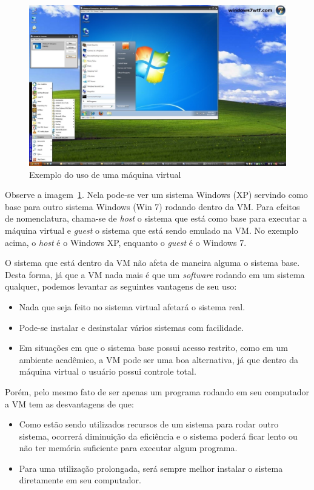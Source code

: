 \documentclass{handout_utfpr}
\begin{document}
\begin{figure}[!h]
  \centering
  \includegraphics[scale=.3]{imagens/vm.jpg}
  \caption{Exemplo do uso de uma máquina virtual}
  \label{fig:vm}
\end{figure}

Observe a imagem~\ref{fig:vm}. Nela pode-se ver um sistema Windows (XP) servindo como base para outro sistema Windows (Win 7) rodando dentro da VM\@. Para efeitos de nomenclatura, chama-se de \textit{host} o sistema que está como base para executar a máquina virtual e \textit{guest} o sistema que está sendo emulado na VM\@. No exemplo acima, o \textit{host} é o Windows XP, enquanto o \textit{guest} é o Windows 7.

O sistema que está dentro da VM não afeta de maneira alguma o sistema base. Desta forma, já que a VM nada mais é que um \textit{software} rodando em um sistema qualquer, podemos levantar as seguintes vantagens de seu uso:

\begin{itemize}
\item Nada que seja feito no sistema virtual afetará o sistema real.
\item Pode-se instalar e desinstalar vários sistemas com facilidade.
\item Em situações em que o sistema base possui acesso restrito, como em um ambiente acadêmico, a VM pode ser uma boa alternativa, já que dentro da máquina virtual o usuário possui controle total.
\end{itemize}

Porém, pelo mesmo fato de ser apenas um programa rodando em seu computador a VM tem as desvantagens de que:

\begin{itemize}
\item Como estão sendo utilizados recursos de um sistema para rodar outro sistema, ocorrerá diminuição da eficiência e o sistema poderá ficar lento ou não ter memória suficiente para executar algum programa.
  \item Para uma utilização prolongada, será sempre melhor instalar o sistema diretamente em seu computador.
\end{itemize}
\end{document}

